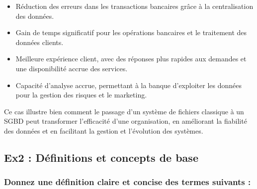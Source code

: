 \documentclass{article}
\begin{document}
    \begin{itemize}
      \item Réduction des erreurs dans les transactions bancaires grâce à la centralisation des données.
      \item Gain de temps significatif pour les opérations bancaires et le traitement des données clients.
      \item Meilleure expérience client, avec des réponses plus rapides aux demandes et une disponibilité accrue des services.
      \item Capacité d’analyse accrue, permettant à la banque d’exploiter les données pour la gestion des risques et le marketing.
    \end{itemize}

Ce cas illustre bien comment le passage d’un système de fichiers classique à un SGBD peut transformer l’efficacité d’une organisation, en améliorant la fiabilité des données et en facilitant la gestion et l’évolution des systèmes.



\vspace{3mm}


\subsection{Ex2 : Définitions et concepts de base}

\subsubsection{Donnez une définition claire et concise des termes suivants :}
\end{document}
